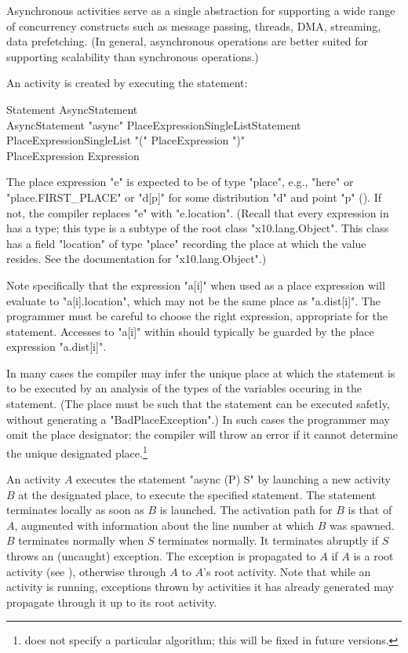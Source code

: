 Asynchronous activities serve as a single abstraction for supporting a
wide range of concurrency constructs such as message passing, threads,
DMA, streaming, data prefetching. (In general, asynchronous operations
are better suited for supporting scalability than synchronous
operations.)

An activity is created by executing the statement:

\begin{grammar}
Statement \: AsyncStatement \\
AsyncStatement \: \xcd"async" PlaceExpressionSingleList\opt Statement \\
PlaceExpressionSingleList \: \xcd"(" PlaceExpression \xcd")" \\
PlaceExpression \: Expression \\
\end{grammar} 

The place expression \xcd"e" is expected to be of type \xcd"place",
e.g., \xcd"here" or \xcd"place.FIRST_PLACE" or \xcd"d[p]" for some
distribution \xcd"d" and point \xcd"p" ().  
If not, the compiler replaces
\xcd"e" with \xcd"e.location". (Recall that every expression in
\Xten{} has a type; this type is a subtype of the root class
\xcd"x10.lang.Object".  This class has a field \xcd"location" of
type \xcd"place" recording the place at which the value resides. See
the documentation for \xcd"x10.lang.Object".)

Note specifically that the expression \xcd"a[i]" when used as a place
expression will evaluate to \xcd"a[i].location", which may not be
the same place as \xcd"a.dist[i]". The programmer must be 
careful to choose the right expression, appropriate for the statement.
Accesses to \xcd"a[i]" within  should typically be guarded 
by the place expression \xcd"a.dist[i]".

In many cases the compiler may infer the unique place at which the
statement is to be executed by an analysis of the types of the
variables occuring in the statement. (The place must be such that the
statement can be executed safetly, without generating a \xcd"BadPlaceException".) In such cases the programmer may omit the place
designator; the compiler will throw an error if it cannot 
determine the unique designated place.\footnote{\XtenCurrVer{} does 
not specify a particular algorithm; this will be fixed in future versions.}

An activity $A$ executes the statement \xcd"async (P) S" by launching
a new activity $B$ at the designated place, to execute the specified
statement. The statement terminates locally as soon as $B$ is
launched.  The activation path for $B$ is that of $A$, augmented with
information about the line number at which $B$ was spawned.  $B$
terminates normally when $S$ terminates normally.  It terminates
abruptly if $S$ throws an (uncaught) exception. The exception is
propagated to $A$ if $A$ is a root activity (see ),
otherwise through $A$ to $A$'s root activity. Note that while an
activity is running, exceptions thrown by activities it has already
generated may propagate through it up to its root activity.

